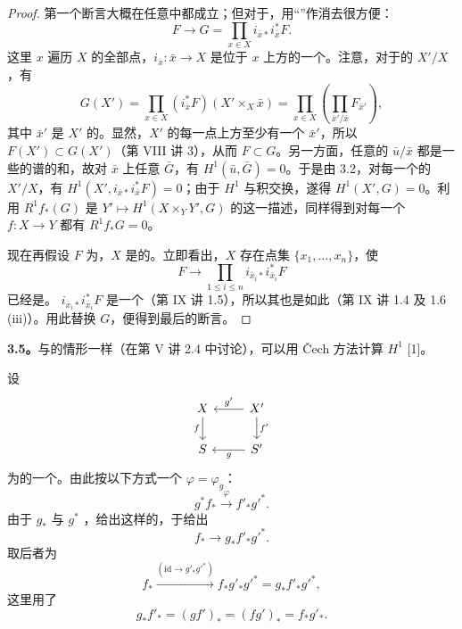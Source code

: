 \begin{proof}
第一个断言大概在任意中都成立；但对于，用“”作消去很方便：
\[
F\longrightarrow G=\prod_{x\in X}i_{\bar x *}i_{\bar x}^{*}F.\tag{3.4}
\]
这里 $x$ 遍历 $X$ 的全部点，$i_{\bar x}:\bar x\to X$ 是位于 $x$ 上方的一个。注意，对于的 $X'/X$，有
\[
G(X')=\prod_{x\in X}(i_{\bar x}^{*}F)(X'\times_X\bar x)
=\prod_{x\in X}\left(\prod_{\bar x'/\bar x}F_{\bar x'}\right),
\]
其中 $\bar x'$ 是 $X'$ 的。显然，$X'$ 的每一点上方至少有一个 $\bar x'$，所以 $F(X')\subset G(X')$（第 VIII 讲 3），从而 $F\subset G$。另一方面，任意的 $\bar u/\bar x$ 都是一些的谱的和，故对 $\bar x$ 上任意 $\bar G$，有 $H^1(\bar u,\bar G)=0$。于是由 3.2，对每一个的 $X'/X$，有 $H^1(X',i_{\bar x *}i_{\bar x}^{*}F)=0$；由于 $H^1$ 与积交换，遂得 $H^1(X',G)=0$。利用 $R^1f_*(G)$ 是 $Y'\mapsto H^1(X\times_Y Y',G)$ 的这一描述，同样得到对每一个 $f:X\to Y$ 都有 $R^1f_*G=0$。

现在再假设 $F$ 为，$X$ 是的。立即看出，$X$ 存在点集 $\{x_1,\ldots,x_n\}$，使
\[
F\longrightarrow\prod_{1\leq i\leq n}i_{\bar x_i *}i_{\bar x_i}^{*}F
\]
已经是。 $i_{\bar x_i *}i_{\bar x_i}^{*}F$ 是一个（第 IX 讲 1.5），所以其也是如此（第 IX 讲 1.4 及 1.6 (iii)）。用此替换 $G$，便得到最后的断言。
\end{proof}

\textbf{3.5。}与的情形一样（在第 V 讲 2.4 中讨论），可以用 Čech 方法计算 $H^1$ [1]。

设
\[
\begin{tikzcd}
X\arrow[d,"f"']&X'\arrow[l,"g'"']\arrow[d,"f'"]\\
S&S'\arrow[l,"g"]
\end{tikzcd}
\]
为的一个。由此按以下方式一个 $\varphi=\varphi_g$：
\[
g^*f_*\xrightarrow{\varphi}f'_*g'^*.\tag{4.1}
\]
由于 $g_*$ 与 $g^*$ ，给出这样的，于给出
\[
f_*\longrightarrow g_*f'_*g'^*.\tag{4.1 adj}
\]
取后者为
\[
f_*\xrightarrow{(\mathrm{id}\to g'_*g'^*)}f_*g'_*g'^*=g_*f'_*g'^*,
\]
这里用了
\[
g_*f'_*=(gf')_*=(fg')_*=f_*g'_*.
\]

